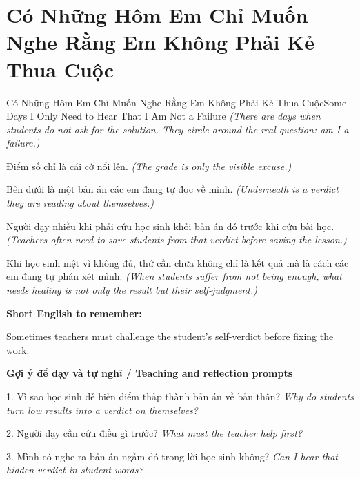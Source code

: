 \section{Có Những Hôm Em Chỉ Muốn Nghe Rằng Em Không Phải Kẻ Thua Cuộc}
\begin{truyen}{Có Những Hôm Em Chỉ Muốn Nghe Rằng Em Không Phải Kẻ Thua Cuộc}{Some Days I Only Need to Hear That I Am Not a Failure}
\textit{(There are days when students do not ask for the solution. They circle around the real question: am I a failure.)}

Điểm số chỉ là cái cớ nổi lên.
\textit{(The grade is only the visible excuse.)}

Bên dưới là một bản án các em đang tự đọc về mình.
\textit{(Underneath is a verdict they are reading about themselves.)}

Người dạy nhiều khi phải cứu học sinh khỏi bản án đó trước khi cứu bài học.
\textit{(Teachers often need to save students from that verdict before saving the lesson.)}

\end{truyen}

\begin{baihoc}
Khi học sinh mệt vì không đủ, thứ cần chữa không chỉ là kết quả mà là cách các em đang tự phán xét mình.
\textit{(When students suffer from not being enough, what needs healing is not only the result but their self-judgment.)}
\end{baihoc}

\begin{ghinhoanh}
\textbf{Short English to remember:}

Sometimes teachers must challenge the student's self-verdict before fixing the work.

\end{ghinhoanh}

\begin{tuhocnhanh}
\textbf{Gợi ý để dạy và tự nghĩ / Teaching and reflection prompts}

1. Vì sao học sinh dễ biến điểm thấp thành bản án về bản thân? \textit{Why do students turn low results into a verdict on themselves?}

2. Người dạy cần cứu điều gì trước? \textit{What must the teacher help first?}

3. Mình có nghe ra bản án ngầm đó trong lời học sinh không? \textit{Can I hear that hidden verdict in student words?}
\end{tuhocnhanh}
